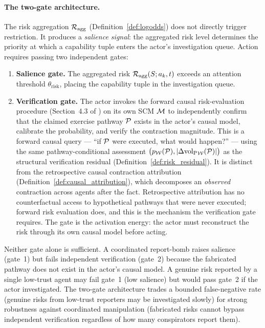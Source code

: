 \paragraph{The two-gate architecture.} The risk aggregation
$\mathcal{R}_{\mathrm{agg}}$ (Definition~\ref{def:logodds}) does not directly
trigger restriction. It produces a \emph{salience signal}: the aggregated
risk level determines the priority at which a capability tuple enters the
actor's investigation queue. Action requires passing two independent gates:
\begin{enumerate}
\item \textbf{Salience gate.} The aggregated risk
    $\mathcal{R}_{\mathrm{agg}}(S; a_k, t)$ exceeds an attention threshold
    $\theta_{\mathrm{risk}}$, placing the capability tuple in the
    investigation queue.
\item \textbf{Verification gate.} The actor invokes the forward
    causal risk-evaluation procedure (Section~4.3 of
    \citet{lasser2026horizon}) on its own SCM $\mathcal{M}$ to independently
    confirm that the claimed exercise pathway $\mathcal{P}$ exists in
    the actor's causal model, calibrate the probability, and verify
    the contraction magnitude. This is a forward causal query ---
    ``if $\mathcal{P}$ were executed, what would happen?'' --- using
    the same pathway-conditional assessment
    $\bigl(p_{\mathcal{W}}(\mathcal{P}), |\Delta {\operatorname{vol}_{\mathrm{P}}}_{\mathcal{W}}(\mathcal{P})|\bigr)$
    as the structural verification residual
    (Definition~\ref{def:risk_residual}). It is distinct from the
    retrospective causal contraction attribution
    (Definition~\ref{def:causal_attribution}), which decomposes an
    \emph{observed} contraction across agents after the fact.
    Retrospective attribution has no counterfactual access to
    hypothetical pathways that were never executed; forward risk
    evaluation does, and this is the mechanism the verification gate
    requires. The gate is the activation energy: the actor must
    reconstruct the risk through its own causal model before
    acting.
\end{enumerate}
Neither gate alone is sufficient. A coordinated report-bomb raises salience
(gate~1) but fails independent verification (gate~2) because the fabricated
pathway does not exist in the actor's causal model. A genuine risk reported
by a single low-trust agent may fail gate~1 (low salience) but would pass
gate~2 if the actor investigated. The two-gate architecture trades a
bounded false-negative rate (genuine risks from low-trust reporters may be
investigated slowly) for strong robustness against coordinated manipulation
(fabricated risks cannot bypass independent verification regardless of how
many conspirators report them).

